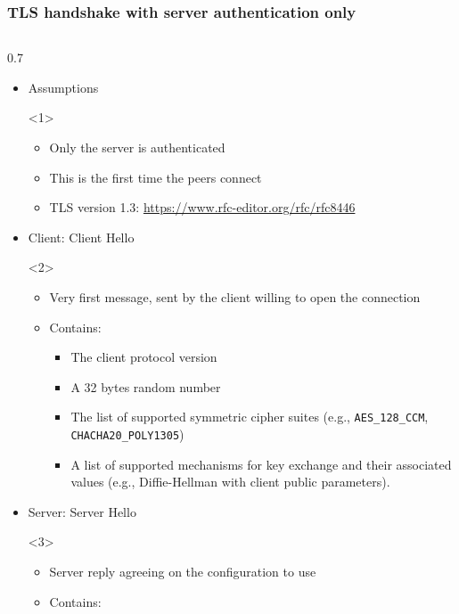 \begin{frame}
  \frametitle{TLS handshake with server authentication only}
  \begin{columns}
    \begin{column}{0.7\textwidth}
      \begin{itemize}
        \item<1-> Assumptions
          \begin{onlyenv}<1>
            \begin{itemize}
              \item Only the server is authenticated
              \item This is the first time the peers connect
              \item TLS version 1.3: \url{https://www.rfc-editor.org/rfc/rfc8446}
            \end{itemize}
          \end{onlyenv}
        \item<2-> Client: Client Hello
          \begin{onlyenv}<2>
            \begin{itemize}
              \item Very first message, sent by the client willing to open the connection
              \item Contains:
                \begin{itemize}
                  \item The client protocol version
                  \item A 32 bytes random number
                  \item The list of supported symmetric cipher suites (e.g., \texttt{AES\_128\_CCM}, \texttt{CHACHA20\_POLY1305})
                  \item A list of supported mechanisms for key exchange and their associated
                    values (e.g., Diffie-Hellman with client public parameters).
                \end{itemize}
            \end{itemize}
          \end{onlyenv}
        \item<3-> Server: Server Hello
          \begin{onlyenv}<3>
            \begin{itemize}
              \item Server reply agreeing on the configuration to use
              \item Contains:

\end{itemize}
\end{onlyenv}
\end{itemize}
\end{column}
\end{columns}
\end{frame}
